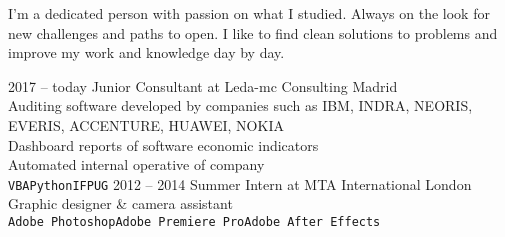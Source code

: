 \documentclass[9pt]{developercv} %
\begin{document}
\vspace{1cm}



\begin{minipage}[t]{0.4\textwidth} %
	\vspace{-\baselineskip} %
	
	I'm a dedicated person with passion on what I studied. Always on the look for new challenges and paths to open.
	I like to find clean solutions to problems and improve my work and knowledge day by day.
	
\end{minipage}
\hfill %
\begin{minipage}[t]{0.5\textwidth} %
	\vspace{-\baselineskip} %
	\begin{barchart}{5.5} 
	\end{barchart}
\end{minipage}

\begin{minipage}[t]{0.4\textwidth}
	\vspace{-15mm} %
\end{minipage}

\vspace{0.5cm}

\begin{entrylist}
	\entry
		{2017 -- today}
		{Junior Consultant at Leda-mc Consulting}
		{Madrid}
		{\\Auditing software developed by companies such as IBM, INDRA, NEORIS, EVERIS, ACCENTURE, HUAWEI, NOKIA\\Dashboard reports of software economic indicators \\ Automated internal operative of company \\ \texttt{VBA}\slashsep\texttt{Python}\slashsep\texttt{IFPUG}}
	\entry
		{2012 -- 2014}
		{Summer Intern at MTA International}
		{London}
		{\\Graphic designer \& camera assistant\\ \texttt{Adobe Photoshop}\slashsep\texttt{Adobe Premiere Pro}\slashsep\texttt{Adobe After Effects}}
\end{entrylist}
\end{document}
